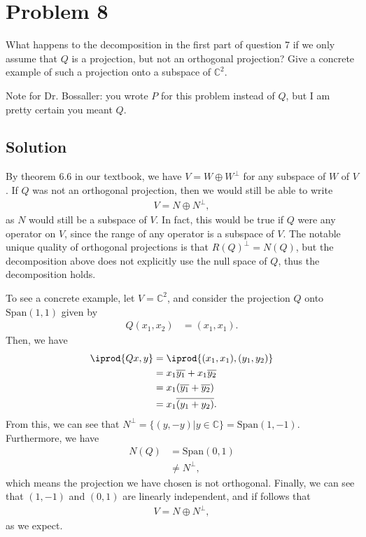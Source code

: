 \documentclass[10pt,a4paper]{article}
\theoremstyle{definition}
\begin{document}
\section*{Problem 8}
What happens to the decomposition in the first part of question 7 if we only assume that $Q$ is a projection, but not an orthogonal projection? Give a concrete example of such a projection onto a subspace of $\mathbb{C}^2$.

Note for Dr. Bossaller: you wrote $P$ for this problem instead of $Q$, but I am pretty certain you meant $Q$.

\subsection*{Solution}
By theorem 6.6 in our textbook, we have $V = W \oplus W^\perp$ for any subspace of $W$ of $V$. If $Q$ was not an orthogonal projection, then we would still be able to write
\begin{align*}
V = N \oplus N^\perp,
\end{align*}
as $N$ would still be a subspace of $V$. In fact, this would be true if $Q$ were any operator on $V$, since the range of any operator is a subspace of $V$. The notable unique quality of orthogonal projections is that $R(Q)^\perp = N(Q)$, but the decomposition above does not explicitly use the null space of $Q$, thus the decomposition holds.

To see a concrete example, let $V = \mathbb{C}^2$, and consider the projection $Q$ onto $\text{Span}(1,1)$ given by 
\begin{align*}
Q (x_1, x_2) &= (x_1, x_1).
\end{align*}
Then, we have
\begin{align*}
\iprod{Qx, y} &= \iprod{(x_1, x_1), (y_1, y_2)}\\
&= x_1 \overline{y_1} + x_1 \overline{y_2}\\
&= x_1 (\overline{y_1} + \overline{y_2})\\
&= x_1 \overline{(y_1 + y_2)}.
\end{align*}
From this, we can see that $N^\perp = \{(y, -y) | y \in \mathbb{C} \} = \text{Span}(1, -1)$. Furthermore, we have
\begin{align*}
N(Q) &= \text{Span}(0, 1)\\
&\not = N^\perp,
\end{align*}
which means the projection we have chosen is not orthogonal. Finally, we can see that $(1, -1)$ and $(0, 1)$ are linearly independent, and if follows that 
\begin{align*}
V = N \oplus N^\perp,
\end{align*}
as we expect.
\end{document}
